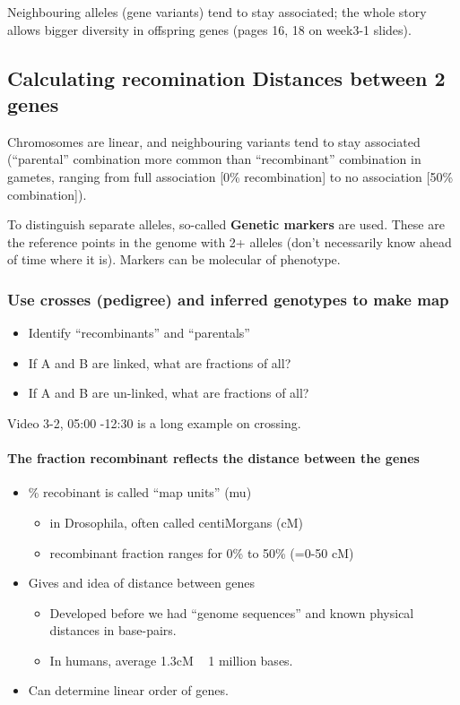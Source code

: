 \documentclass{scrartcl}
\begin{document}
Neighbouring alleles (gene variants) tend to stay associated; the whole story
allows bigger diversity in offspring genes (pages 16, 18 on week3-1 slides).

\subsection{Calculating recomination Distances between 2 genes}
\label{sec:3-2}
Chromosomes are linear, and neighbouring variants tend to stay associated
(``parental'' combination more common than ``recombinant'' combination in
gametes, ranging from full association [0\% recombination] to no association
[50\% combination]).

To distinguish separate alleles, so-called {\bf Genetic markers} are used. These
are the reference points in the genome with 2+ alleles (don't necessarily know
ahead of time where it is). Markers can be molecular of phenotype.

\subsubsection{Use crosses (pedigree) and inferred genotypes to make map}
\label{sec:3-2-1}
\begin{itemize}
\item Identify ``recombinants'' and ``parentals''
\item If A and B are linked, what are fractions of all?
\item If A and B are un-linked, what are fractions of all?
\end{itemize}
Video 3-2, 05:00 -12:30 is a long example on crossing.

\paragraph{The fraction recombinant reflects the distance between the genes}

\begin{itemize}
\item \% recobinant is called ``map units'' (mu)
  \begin{itemize}
  \item in Drosophila, often called centiMorgans (cM)
  \item recombinant fraction ranges for 0\% to 50\% (=0-50 cM)
  \end{itemize}
\item Gives and idea of distance between genes
  \begin{itemize}
  \item Developed before we had ``genome sequences'' and known physical
    distances in base-pairs.
  \item In humans, average 1.3cM ~ 1 million bases.
  \end{itemize}
\item Can determine linear order of genes.
\end{itemize}
\end{document}
